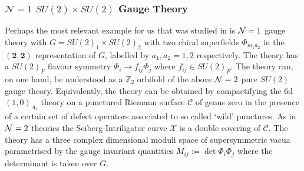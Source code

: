 \documentclass[main.tex]{subfiles}
\begin{document}
\subsubsection{$\mathcal{N}=1$ $SU(2)\times SU(2)$ Gauge Theory}
Perhaps the most relevant example for us that was studied in \cite{Intriligator:1994sm} is $\mathcal{N}=1$ gauge theory with $G=SU(2)_1\times SU(2)_2$ with two chiral superfields $\Phi_{ia_1a_2}$ in the $\left(\mathbf{2},\mathbf{2}\right)$ representation of $G$, labelled by $a_1,a_2=1,2$ respectively. The theory has a $SU(2)_F$ flavour symmetry $\Phi_i\to f_{ij}\Phi_j$ where $f_{ij}\in SU(2)_F$. The theory can, on one hand, be understood as a $\mathbb{Z}_2$ orbifold of the above $\mathcal{N}=2$ pure $SU(2)$ gauge theory. Equivalently, the theory can be obtained by compactifying the 6d $(1,0)_{A_1}$ theory on a punctured Riemann surface $\mathcal{C}$ of genus zero in the presence of a certain set of defect operators associated to so called `wild' punctures. As in $\mathcal{N}=2$ theories the Seiberg-Intriligator curve $\mathcal{X}$ is a double covering of $\mathcal{C}$. The theory has a three complex dimensional moduli space of supersymmetric vacua parametrised by the gauge invariant quantities $M_{ij}:=\det \Phi_i\Phi_j$ where the determinant is taken over $G$. 
\end{document}
